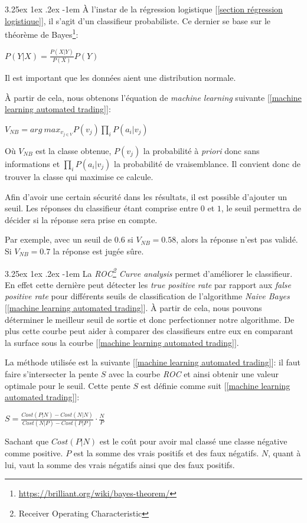 \documentclass[a4paper, 11pt]{article}
\makeatletter
\renewcommand\paragraph{\@startsection{paragraph}{5}{\z@}%
  {3.25ex \@plus1ex \@minus.2ex}%
  {-1em}%
  {\normalfont\normalsize\bfseries}}
\makeatother
\begin{document}
\paragraph{}
À l'instar de la régression logistique [\ref{section régression logistique}], il s'agit d'un classifieur probabiliste. Ce dernier se base sur le théorème de Bayes\footnote{\url{https://brilliant.org/wiki/bayes-theorem/}}:
\begin{center}
$P(Y|X) = \frac{P(X|Y)}{P(X)}P(Y)$
\end{center}
Il est important que les données aient une distribution normale.

À partir de cela, nous obtenons l'équation de \textit{machine learning} suivante [\ref{machine learning automated trading}]:
\begin{center}
$V_{NB} = arg\ max_{v_{j \in V}} P(v_j) \prod\limits_i P(a_i | v_j)$
\end{center}
Où $V_{NB}$ est la classe obtenue, $P(v_j)$ la probabilité à \textit{priori} donc sans informations et $\prod\limits_i P(a_i | v_j)$ la probabilité de vraisemblance.
Il convient donc de trouver la classe qui maximise ce calcule.

Afin d'avoir une certain sécurité dans les résultats, il est possible d'ajouter un seuil. Les réponses du classifieur étant comprise entre $0$ et $1$, le seuil permettra de décider si la réponse sera prise en compte.

Par exemple, avec un seuil de $0.6$ si $V_{NB} = 0.58$, alors la réponse n'est pas validé. Si $V_{NB} = 0.7$ la réponse est jugée sûre. 

\paragraph{}\label{section roc curve analysis}
La \textit{ROC\footnote{Receiver Operating Characteristic} Curve analysis} permet d'améliorer le classifieur. En effet cette dernière peut détecter les \textit{true positive rate} par rapport aux \textit{false positive rate} pour différents seuils de classification de l'algorithme \textit{Naive Bayes} [\ref{machine learning automated trading}]. À partir de cela, nous pouvons déterminer le meilleur seuil de sortie et donc perfectionner notre algorithme.
De plus cette courbe peut aider à comparer des classifieurs entre eux en comparant la surface sous la courbe [\ref{machine learning automated trading}].

La méthode utilisée est la suivante [\ref{machine learning automated trading}]: il faut faire s'intersecter la pente $S$ avec la courbe \textit{ROC} et ainsi obtenir une valeur optimale pour le seuil.
Cette pente $S$ est définie comme suit [\ref{machine learning automated trading}]:
\begin{center}
$S = \frac{Cost(P|N) - Cost(N|N)}{Cost(N|P) - Cost(P|P)} \cdot \frac{N}{P}$
\end{center}
Sachant que $Cost(P|N)$ est le coût pour avoir mal classé une classe négative comme positive. $P$ est la somme des vrais positifs et des faux négatifs. $N$, quant à lui, vaut la somme des vrais négatifs ainsi que des faux positifs.
\end{document}

